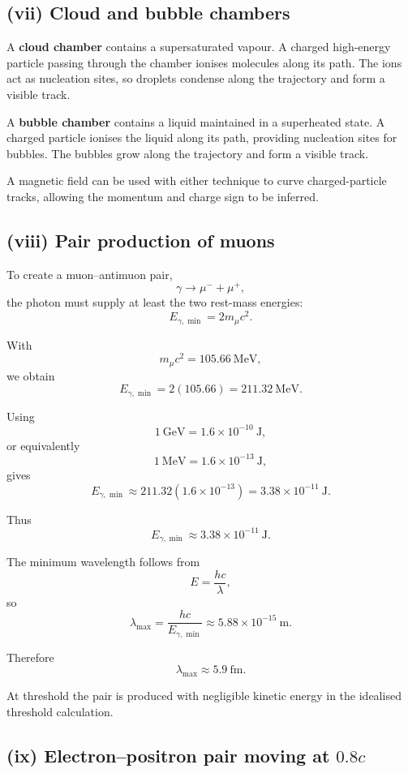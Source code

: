 \documentclass[11pt,a4paper]{article}
\begin{document}
\subsection{(vii) Cloud and bubble chambers}

A \textbf{cloud chamber} contains a supersaturated vapour. A charged high-energy
particle passing through the chamber ionises molecules along its path. The ions act
as nucleation sites, so droplets condense along the trajectory and form a visible
track.

A \textbf{bubble chamber} contains a liquid maintained in a superheated state.
A charged particle ionises the liquid along its path, providing nucleation sites
for bubbles. The bubbles grow along the trajectory and form a visible track.

A magnetic field can be used with either technique to curve charged-particle tracks,
allowing the momentum and charge sign to be inferred.

\subsection{(viii) Pair production of muons}

To create a muon--antimuon pair,
\[
\gamma\rightarrow\mu^-+\mu^+,
\]
the photon must supply at least the two rest-mass energies:
\[
E_{\gamma,\min}=2m_\mu c^2.
\]

With
\[
m_\mu c^2=105.66\ \mathrm{MeV},
\]
we obtain
\[
E_{\gamma,\min}
=
2(105.66)
=
211.32\ \mathrm{MeV}.
\]

Using
\[
1\ \mathrm{GeV}=1.6\times10^{-10}\ \mathrm J,
\]
or equivalently
\[
1\ \mathrm{MeV}=1.6\times10^{-13}\ \mathrm J,
\]
gives
\[
E_{\gamma,\min}
\approx
211.32(1.6\times10^{-13})
=
3.38\times10^{-11}\ \mathrm J.
\]

Thus
\[
\boxed{E_{\gamma,\min}\approx3.38\times10^{-11}\ \mathrm J}.
\]

The minimum wavelength follows from
\[
E=\frac{hc}{\lambda},
\]
so
\[
\lambda_{\max}
=
\frac{hc}{E_{\gamma,\min}}
\approx5.88\times10^{-15}\ \mathrm m.
\]

Therefore
\[
\boxed{\lambda_{\max}\approx5.9\ \mathrm{fm}}.
\]

At threshold the pair is produced with negligible kinetic energy in the idealised
threshold calculation.

\subsection{(ix) Electron--positron pair moving at $0.8c$}
\end{document}
